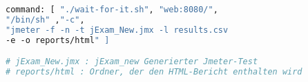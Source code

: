\begin{lstlisting}[language=Dockerfile,label={lst:jmeter},caption={JMeter Ausführungsbefehl}]
    command: [ "./wait-for-it.sh", "web:8080/",
"/bin/sh" ,"-c",
"jmeter -f -n -t jExam_New.jmx -l results.csv
-e -o reports/html" ]

# jExam_New.jmx : jExam_new Generierter Jmeter-Test
# reports/html : Ordner, der den HTML-Bericht enthalten wird
\end{lstlisting}
